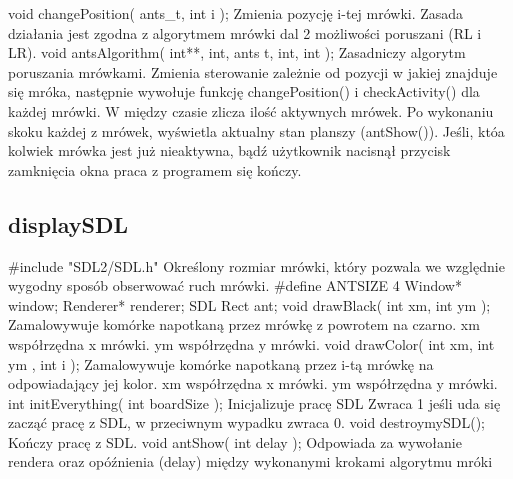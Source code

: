 \documentclass{article}
\begin{document}
\newline
\newline
\newline void changePosition( ants\_t, int i );
\newline Zmienia pozycję i-tej mrówki. Zasada działania jest zgodna z algorytmem mrówki dal 2 możliwości poruszani (RL i LR).
\newline
\newline void antsAlgorithm( int**, int, ants t, int, int );
\newline Zasadniczy algorytm poruszania mrówkami. Zmienia sterowanie zależnie od pozycji w jakiej znajduje się mróka, następnie wywołuje funkcję changePosition() i checkActivity() dla każdej mrówki. W między czasie zlicza ilość aktywnych mrówek. Po wykonaniu skoku każdej z mrówek, wyświetla aktualny stan planszy (antShow()). Jeśli, któa kolwiek mrówka jest już nieaktywna, bądź użytkownik nacisnął przycisk zamknięcia okna praca z programem się kończy.    

\newpage
\subsection{displaySDL}
\#include "SDL2/SDL.h"
\newline Określony rozmiar mrówki, który pozwala we względnie wygodny sposób obserwować ruch mrówki.
\newline \#define ANTSIZE 4
\newline Window* window;
\newline Renderer* renderer;
\newline SDL Rect ant;
\newline 
\newline void drawBlack( int xm, int ym );
\newline Zamalowywuje komórke napotkaną przez mrówkę z powrotem na czarno.
\newline     xm współrzędna x mrówki.
\newline     ym współrzędna y mrówki.
\newline
\newline void drawColor( int xm, int ym , int i );
\newline    Zamalowywuje komórke napotkaną przez i-tą mrówkę na odpowiadający jej kolor.
\newline     xm współrzędna x mrówki.
\newline     ym współrzędna y mrówki.
\newline
\newline int initEverything( int boardSize );
\newline Inicjalizuje pracę SDL
\newline    Zwraca 1 jeśli uda się zacząć pracę z SDL, w przeciwnym wypadku zwraca 0.
\newline
\newline void destroymySDL();
\newline 
    Kończy pracę z SDL.
\newline 
\newline void antShow( int delay );
\newline Odpowiada za wywołanie rendera oraz opóźnienia (delay) między wykonanymi krokami algorytmu mróki
\newpage
\end{document}
